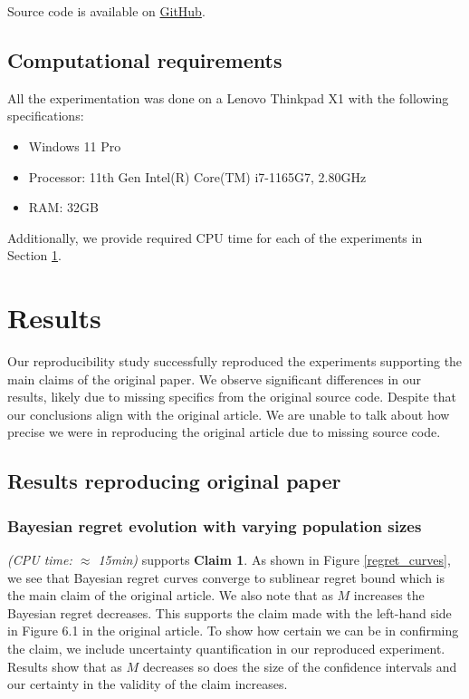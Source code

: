 Source code is available on \href{https://anonymous.4open.science/r/RC2022-Bandit-Theory-and-Thompson-Sampling-Guided-Directed-Evolution-for-Sequence-Optimization-E1D4}{GitHub}.


\subsection{Computational requirements}
All the experimentation was done on a Lenovo Thinkpad X1 with the following specifications:
\begin{itemize}
    \item Windows 11 Pro
    \item Processor: 11th Gen Intel(R) Core(TM) i7-1165G7, 2.80GHz
    \item RAM: 32GB
\end{itemize}

Additionally, we provide required CPU time for each of the experiments in Section \ref{sec:results}.

\section{Results}
\label{sec:results}
Our reproducibility study successfully reproduced the experiments supporting the main claims of the original paper. We observe significant differences in our results, likely due to missing specifics from the original source code. Despite that our conclusions align with the original article. We are unable to talk about how precise we were in reproducing the original article due to missing source code.


\subsection{Results reproducing original paper}
\subsubsection{Bayesian regret evolution with varying population sizes} 
\textit{(CPU time: $\approx$ 15min)} supports \textbf{Claim 1}. As shown in Figure \ref{regret_curves}, we see that Bayesian regret curves converge to sublinear regret bound which is the main claim of the original article. We also note that as $M$ increases the Bayesian regret decreases. This supports the claim made with the left-hand side in Figure 6.1 in the original article. To show how certain we can be in confirming the claim, we include uncertainty quantification in our reproduced experiment. Results show that as $M$ decreases so does the size of the confidence intervals and our certainty in the validity of the claim increases.

